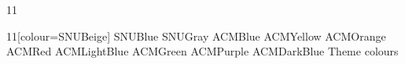 \documentclass[paper=A4]{ropas-poster}
\begin{document}
\begin{postergrid}{1}{1}
  \begin{posterblock}{1}{1}[colour=SNUBeige]
    \textcolor{SNUBlue}{SNUBlue}
    \textcolor{SNUGray}{SNUGray}
    \textcolor{ACMBlue}{ACMBlue}
    \textcolor{ACMYellow}{ACMYellow}
    \textcolor{ACMOrange}{ACMOrange}
    \textcolor{ACMRed}{ACMRed}
    \textcolor{ACMLightBlue}{ACMLightBlue}
    \textcolor{ACMGreen}{ACMGreen}
    \textcolor{ACMPurple}{ACMPurple}
    \textcolor{ACMDarkBlue}{ACMDarkBlue}
    \colorbox{theme-default-bg}{\textcolor{theme-default-text}{Theme colours}}
  \end{posterblock}
\end{postergrid}
\end{document}
